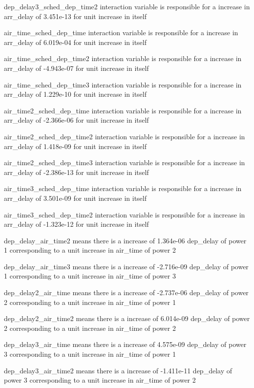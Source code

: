 \documentclass[
]{article}
\begin{document}
dep\_delay3\_sched\_dep\_time2 interaction variable is responsible for a
increase in arr\_delay of 3.451e-13 for unit increase in itself

air\_time\_sched\_dep\_time interaction variable is responsible for a
increase in arr\_delay of 6.019e-04 for unit increase in itself

air\_time\_sched\_dep\_time2 interaction variable is responsible for a
increase in arr\_delay of -4.943e-07 for unit increase in itself

air\_time\_sched\_dep\_time3 interaction variable is responsible for a
increase in arr\_delay of 1.229e-10 for unit increase in itself

air\_time2\_sched\_dep\_time interaction variable is responsible for a
increase in arr\_delay of -2.366e-06 for unit increase in itself

air\_time2\_sched\_dep\_time2 interaction variable is responsible for a
increase in arr\_delay of 1.418e-09 for unit increase in itself

air\_time2\_sched\_dep\_time3 interaction variable is responsible for a
increase in arr\_delay of -2.386e-13 for unit increase in itself

air\_time3\_sched\_dep\_time interaction variable is responsible for a
increase in arr\_delay of 3.501e-09 for unit increase in itself

air\_time3\_sched\_dep\_time2 interaction variable is responsible for a
increase in arr\_delay of -1.323e-12 for unit increase in itself

dep\_delay\_air\_time2 means there is a increase of 1.364e-06 dep\_delay
of power 1 corresponding to a unit increase in air\_time of power 2

dep\_delay\_air\_time3 means there is a increase of -2.716e-09
dep\_delay of power 1 corresponding to a unit increase in air\_time of
power 3

dep\_delay2\_air\_time means there is a increase of -2.737e-06
dep\_delay of power 2 corresponding to a unit increase in air\_time of
power 1

dep\_delay2\_air\_time2 means there is a increase of 6.014e-09
dep\_delay of power 2 corresponding to a unit increase in air\_time of
power 2

dep\_delay3\_air\_time means there is a increase of 4.575e-09 dep\_delay
of power 3 corresponding to a unit increase in air\_time of power 1

dep\_delay3\_air\_time2 means there is a increase of -1.411e-11
dep\_delay of power 3 corresponding to a unit increase in air\_time of
power 2
\end{document}

